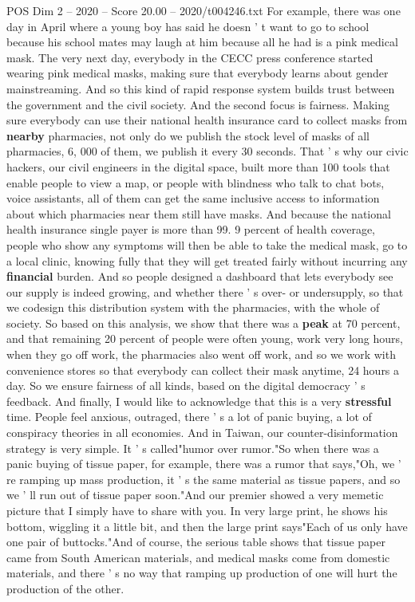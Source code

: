 \begin{textsample}{POS Dim 2 – 2020 – Score 20.00 – 2020/t004246.txt}
For example, there was one day in April where a young boy has said he doesn ' t want to go to school because his school mates may laugh at him because all he had is a pink medical mask.
The very next day, everybody in the CECC press conference started wearing pink medical masks, making sure that everybody learns about gender mainstreaming.
And so this kind of rapid response system builds trust between the government and the civil society.
And the second focus is fairness.
Making sure everybody can use their national health insurance card to collect masks from \textbf{nearby} pharmacies, not only do we publish the stock level of masks of all pharmacies, 6, 000 of them, we publish it every 30 seconds.
That ' s why our civic hackers, our civil engineers in the digital space, built more than 100 tools that enable people to view a map, or people with blindness who talk to chat bots, voice assistants, all of them can get the same inclusive access to information about which pharmacies near them still have masks.
And because the national health insurance single payer is more than 99. 9 percent of health coverage, people who show any symptoms will then be able to take the medical mask, go to a local clinic, knowing fully that they will get treated fairly without incurring any \textbf{financial} burden.
And so people designed a dashboard that lets everybody see our supply is indeed growing, and whether there ' s over- or undersupply, so that we codesign this distribution system with the pharmacies, with the whole of society.
So based on this analysis, we show that there was a \textbf{peak} at 70 percent, and that remaining 20 percent of people were often young, work very long hours, when they go off work, the pharmacies also went off work, and so we work with convenience stores so that everybody can collect their mask anytime, 24 hours a day.
So we ensure fairness of all kinds, based on the digital democracy ' s feedback.
And finally, I would like to acknowledge that this is a very \textbf{stressful} time.
People feel anxious, outraged, there ' s a lot of panic buying, a lot of conspiracy theories in all economies.
And in Taiwan, our counter-disinformation strategy is very simple.
It ' s called"humor over rumor."So when there was a panic buying of tissue paper, for example, there was a rumor that says,"Oh, we ' re ramping up mass production, it ' s the same material as tissue papers, and so we ' ll run out of tissue paper soon."And our premier showed a very memetic picture that I simply have to share with you.
In very large print, he shows his bottom, wiggling it a little bit, and then the large print says"Each of us only have one pair of buttocks."And of course, the serious table shows that tissue paper came from South American materials, and medical masks come from domestic materials, and there ' s no way that ramping up production of one will hurt the production of the other.

\end{textsample}
